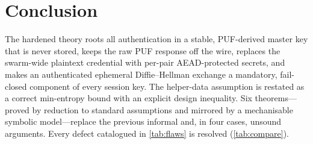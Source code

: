 \documentclass[11pt]{article}
\theoremstyle{plain}
\theoremstyle{definition}
\begin{document}
\section{Conclusion}
The hardened theory roots all authentication in a stable, PUF-derived master
key that is never stored, keeps the raw PUF response off the wire, replaces
the swarm-wide plaintext credential with per-pair AEAD-protected secrets, and
makes an authenticated ephemeral Diffie--Hellman exchange a mandatory,
fail-closed component of every session key. The helper-data assumption is
restated as a correct min-entropy bound with an explicit design inequality.
Six theorems---proved by reduction to standard assumptions and mirrored by a
mechanisable symbolic model---replace the previous informal and, in four
cases, unsound arguments. Every defect catalogued in \cref{tab:flaws} is
resolved (\cref{tab:compare}).
\end{document}
